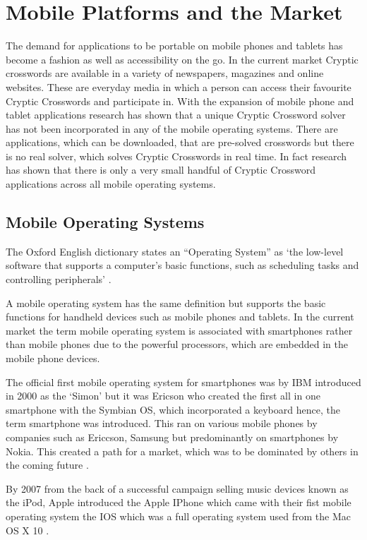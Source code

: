 \section{Mobile Platforms and the Market}

The demand for applications to be portable on mobile phones and tablets has
become a fashion as well as accessibility on the go. In the current market
Cryptic crosswords are available in a variety of newspapers, magazines and
online websites. These are everyday media in which a person can access their
favourite Cryptic Crosswords and participate in. With the expansion of mobile
phone and tablet applications research has shown that a unique Cryptic Crossword
solver has not been incorporated in any of the mobile operating systems. There
are applications, which can be downloaded, that are pre-solved crosswords but
there is no real solver, which solves Cryptic Crosswords in real time. In fact
research has shown that there is only a very small handful of Cryptic Crossword
applications across all mobile operating systems.

\subsection{Mobile Operating Systems}

The Oxford English dictionary states an ``Operating System'' as `the low-level
software that supports a computer’s basic functions, such as scheduling tasks
and controlling peripherals' \citep{oxford_dictionary11}.

A mobile operating system has the same definition but supports the basic
functions for handheld devices such as mobile phones and tablets. In the current
market the term mobile operating system is associated with smartphones rather
than mobile phones due to the powerful processors, which are embedded in the
mobile phone devices.

The official first mobile operating system for smartphones was by IBM introduced
in 2000 as the `Simon' but it was Ericson who created the first all in one
smartphone with the Symbian OS, which incorporated a keyboard hence, the term
smartphone was introduced. This ran on various mobile phones by companies such
as Ericcson, Samsung but predominantly on smartphones by Nokia. This created a
path for a market, which was to be dominated by others in the coming future
\citep{smartphone11}.

By 2007 from the back of a successful campaign selling music devices known as
the iPod, Apple introduced the Apple IPhone which came with their fist mobile
operating system the IOS which was a full operating system used from the Mac OS
X 10 \citep{macworld07}.

